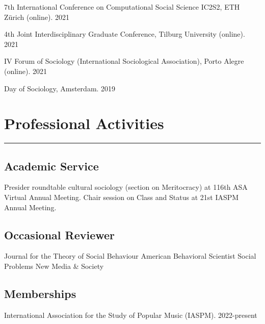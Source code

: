 \documentclass[12pt,]{article}
\begin{document}
7th International Conference on Computational Social Science IC2S2, ETH
Zürich (online). \hfill \begingroup\small 2021\endgroup

4th Joint Interdisciplinary Graduate Conference, Tilburg University
(online). \hfill \begingroup\small 2021\endgroup

IV Forum of Sociology (International Sociological Association), Porto
Alegre (online). \hfill \begingroup\small 2021\endgroup

Day of Sociology, Amsterdam. \hfill \begingroup\small 2019\endgroup

\hypertarget{professional-activities}{%
\section{Professional Activities}\label{professional-activities}}

\vspace{-10pt}
\rule{1\linewidth}{\linethickness}

\hypertarget{academic-service}{%
\subsection{Academic Service}\label{academic-service}}

Presider roundtable cultural sociology (section on Meritocracy) at 116th
ASA Virtual Annual Meeting. \newline Chair session on Class and Status
at 21st IASPM Annual Meeting.

\hypertarget{occasional-reviewer}{%
\subsection{Occasional Reviewer}\label{occasional-reviewer}}

Journal for the Theory of Social Behaviour \newline American Behavioral
Scientist \newline Social Problems \newline New Media \& Society

\hypertarget{memberships}{%
\subsection{Memberships}\label{memberships}}

International Association for the Study of Popular Music (IASPM).
\hfill \begingroup\small 2022-present\endgroup
\end{document}
